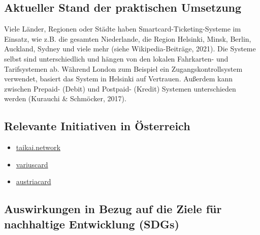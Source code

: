 \documentclass[
]{book}
\providecommand{\tightlist}{%
  \setlength{\itemsep}{0pt}\setlength{\parskip}{0pt}}
\begin{document}
\hypertarget{aktueller-stand-der-praktischen-umsetzung-26}{%
\subsection*{Aktueller Stand der praktischen Umsetzung}\label{aktueller-stand-der-praktischen-umsetzung-26}}

Viele Länder, Regionen oder Städte haben Smartcard-Ticketing-Systeme im Einsatz, wie z.B. die gesamten Niederlande, die Region Helsinki, Minsk, Berlin, Auckland, Sydney und viele mehr (siehe Wikipedia-Beiträge, 2021). Die Systeme selbst sind unterschiedlich und hängen von den lokalen Fahrkarten- und Tarifsystemen ab. Während London zum Beispiel ein Zugangskontrollsystem verwendet, basiert das System in Helsinki auf Vertrauen. Außerdem kann zwischen Prepaid- (Debit) und Postpaid- (Kredit) Systemen unterschieden werden (Kurauchi \& Schmöcker, 2017).

\hypertarget{relevante-initiativen-in-uxf6sterreich-26}{%
\subsection*{Relevante Initiativen in Österreich}\label{relevante-initiativen-in-uxf6sterreich-26}}

\begin{itemize}
\tightlist
\item
  \href{https://taikai.network/en/wiener-linien/challenges/tickethon}{taikai.network}
\item
  \href{https://www.variuscard.com/}{variuscard}
\item
  \href{https://www.austriacard.com/}{austriacard}
\end{itemize}

\hypertarget{auswirkungen-in-bezug-auf-die-ziele-fuxfcr-nachhaltige-entwicklung-sdgs-26}{%
\subsection*{Auswirkungen in Bezug auf die Ziele für nachhaltige Entwicklung (SDGs)}\label{auswirkungen-in-bezug-auf-die-ziele-fuxfcr-nachhaltige-entwicklung-sdgs-26}}
\end{document}
